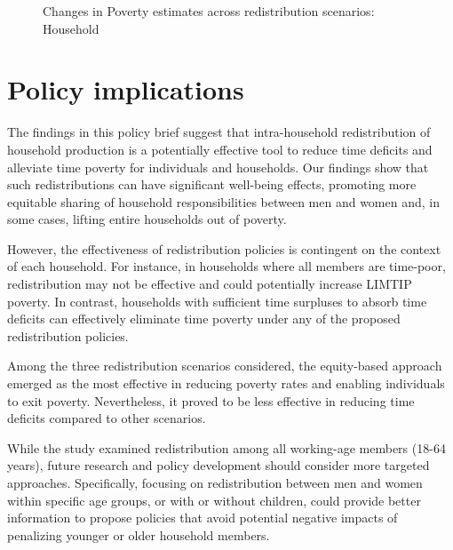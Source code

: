 \documentclass[
  11pt,
]{article}
\begin{document}
\begin{figure}[H]


\caption{\label{fig-limtip1}Changes in Poverty estimates across
redistribution scenarios: Household}

\end{figure}%

\section{Policy implications}\label{policy-implications}

The findings in this policy brief suggest that intra-household
redistribution of household production is a potentially effective tool
to reduce time deficits and alleviate time poverty for individuals and
households. Our findings show that such redistributions can have
significant well-being effects, promoting more equitable sharing of
household responsibilities between men and women and, in some cases,
lifting entire households out of poverty.

However, the effectiveness of redistribution policies is contingent on
the context of each household. For instance, in households where all
members are time-poor, redistribution may not be effective and could
potentially increase LIMTIP poverty. In contrast, households with
sufficient time surpluses to absorb time deficits can effectively
eliminate time poverty under any of the proposed redistribution
policies.

Among the three redistribution scenarios considered, the equity-based
approach emerged as the most effective in reducing poverty rates and
enabling individuals to exit poverty. Nevertheless, it proved to be less
effective in reducing time deficits compared to other scenarios.

While the study examined redistribution among all working-age members
(18-64 years), future research and policy development should consider
more targeted approaches. Specifically, focusing on redistribution
between men and women within specific age groups, or with or without
children, could provide better information to propose policies that
avoid potential negative impacts of penalizing younger or older
household members.
\end{document}
